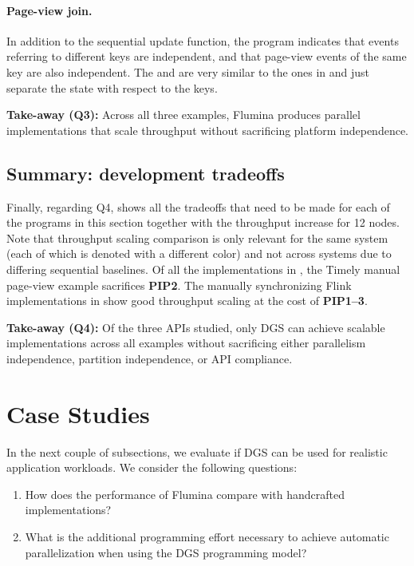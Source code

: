 \paragraph{Page-view join.}
In addition to the sequential update function, the program indicates that events referring to different keys are independent, and that page-view events of the same key are also independent. The  and  are very similar to the ones in  and just separate the state with respect to the keys.

\begin{takeaway}
\textbf{Take-away (Q3):}
Across all three examples,
Flumina produces parallel implementations that scale throughput without sacrificing platform independence.
\end{takeaway}

\subsection{Summary: development tradeoffs}
\label{dgs:ssec:eval-development-tradeoffs}

Finally, regarding Q4,
 shows all the tradeoffs that need to be made for each of the programs in this section together with the throughput increase for 12 nodes.
Note that throughput scaling comparison is only relevant for the same system (each of which is denoted with a different color) and not across systems due to differing sequential baselines.
Of all the implementations in , the Timely manual page-view example sacrifices \textbf{PIP2}.
The manually synchronizing Flink implementations in  show good throughput scaling at the cost of \textbf{PIP1--3}.

\begin{takeaway}
\textbf{Take-away (Q4):}
Of the three APIs studied,
only DGS can achieve scalable implementations across
all examples without sacrificing either parallelism independence, partition independence, or API compliance.
\end{takeaway}


\section{Case Studies}
\label{appendix:case-studies}

In the next couple of subsections, we evaluate if DGS can be used for realistic application workloads.
We consider the following questions:
\begin{enumerate}
    \item How does the performance of Flumina compare with handcrafted implementations?
    \item What is the additional programming effort necessary to achieve automatic parallelization when using the DGS programming model?
\end{enumerate}

